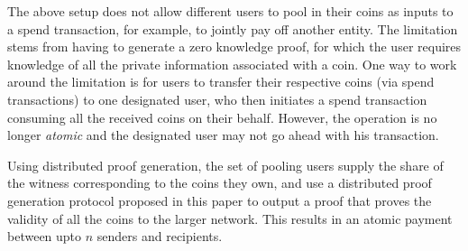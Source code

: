  The above setup does not allow different users to pool in their coins as inputs to a spend transaction, for example,
to jointly pay off another entity. The limitation stems from having to generate a zero knowledge proof, for which the user requires knowledge of all the
private information associated with a coin. One way to work around the limitation is for users to transfer their respective coins (via spend transactions) 
to one designated user, who then initiates a spend transaction consuming all the received coins on their behalf. 
However, the operation is no longer {\em atomic} and the designated user may not go ahead with his transaction. 

Using distributed proof generation, the set of pooling users supply the share of the witness corresponding to the coins they own,
and use a distributed proof generation protocol proposed in this paper to output a proof that proves the validity of all the coins to the 
larger network. This results in an atomic payment between upto $n$ senders and recipients.


